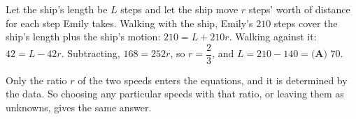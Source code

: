 Let the ship's length be $L$ steps and let the ship move $r$ steps' worth of distance for each step Emily takes. Walking with the ship, Emily's $210$ steps cover the ship's length plus the ship's motion: $210=L+210r$. Walking against it: $42=L-42r$. Subtracting, $168=252r$, so $r=\dfrac23$, and $L=210-140=\boxed{\textbf{(A) }70}$.

Only the ratio $r$ of the two speeds enters the equations, and it is determined by the data. So choosing any particular speeds with that ratio, or leaving them as unknowns, gives the same answer.
